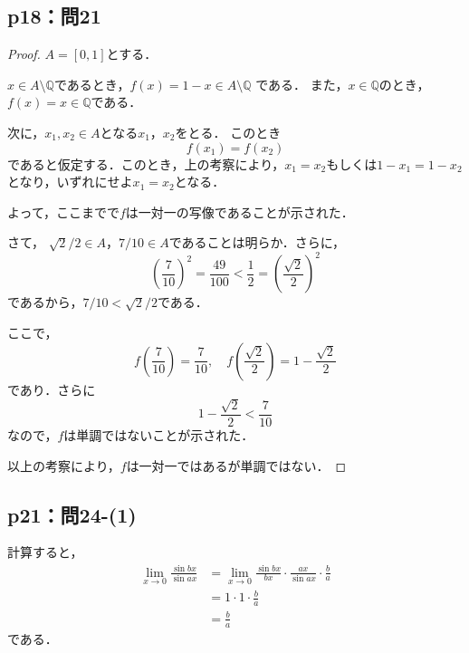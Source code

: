 \documentclass[uplatex,dvipdfmx,a4paper,10pt,fleqn]{jsarticle}
\begin{document}
\subsection*{p18：問21}

\begin{tleftbar}
    \begin{proof}
    $ A = [0,1]$とする．

    $x \in A \setminus \mathbb{Q}$であるとき，$f(x)=1-x \in A \setminus \mathbb{Q}$ である．
    また，$x \in \mathbb{Q}$のとき，$f(x)=x \in \mathbb{Q}$である．

    次に，$ x_1 , x_2 \in A$となる$x_1$，$x_2$をとる．
    このとき
    \[
        f(x_1)=f(x_2)
    \]
    であると仮定する．このとき，上の考察により，$x_1 = x_2$もしくは$1-x_1 = 1-x_2$となり，いずれにせよ$x_1 =x_2$となる．

    よって，ここまでで$f$は一対一の写像であることが示された．
   
   さて， $ \sqrt{2}/2 \in A$，$7/10 \in A$であることは明らか．さらに，
    \[
        \left ( \frac{7}{10} \right)^2 = \frac{49}{100} <\frac{1}{2}=\left ( \frac{\sqrt{2}}{2} \right)^2 
    \]
    であるから，$7/10< \sqrt{2}/2$である．

    ここで，
    \[
    f\left ( \frac{7}{10} \right)=\frac{7}{10},\quad f\left(\frac{\sqrt{2}}{2} \right)= 1-\frac{\sqrt{2}}{2}
    \]
    であり．さらに
    \[
        1-\frac{\sqrt{2}}{2} <\frac{7}{10}
    \]
    なので，$f$は単調ではないことが示された．

    以上の考察により，$f$は一対一ではあるが単調ではない．
\end{proof}
\end{tleftbar}

\subsection*{p21：問24-(1)}

\begin{tleftbar}
    計算すると，
    \begin{align*} 
        \lim_{x \to 0} \frac{\sin bx}{\sin ax} & = \lim_{x \to 0} \frac{\sin bx}{b x} \cdot \frac{ax}{ \sin ax} \cdot \frac{b}{a} \\
        & = 1 \cdot 1 \cdot \frac{b}{a} \\
        & = \frac{b}{a}
    \end{align*} 
    である．
\end{tleftbar}
\end{document}
